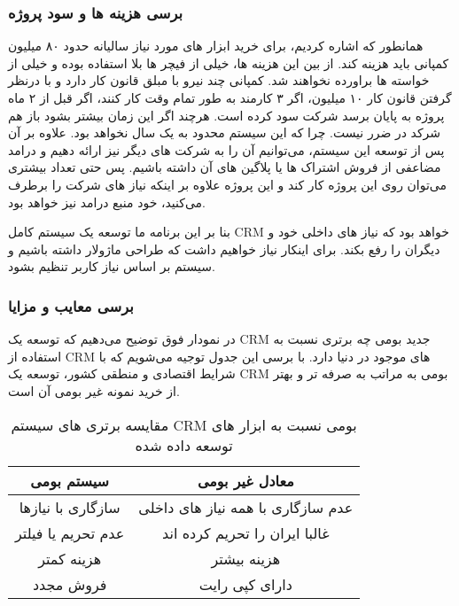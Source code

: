 \subsubsection{برسی هزینه ها و سود پروژه}
همانطور که اشاره کردیم، برای خرید ابزار های مورد نیاز سالیانه حدود ۸۰ میلیون کمپانی باید هزینه کند. از بین این هزینه ها، خیلی از فیچر ها بلا استفاده بوده
و خیلی از خواسته ها براورده نخواهند شد.
کمپانی چند نیرو با مبلق قانون کار دارد و با درنظر گرفتن قانون کار ۱۰ میلیون، اگر ۳ کارمند به طور تمام وقت کار کنند، اگر قبل از ۲ ماه پروژه به پایان برسد شرکت سود کرده است.
هرچند اگر این زمان بیشتر بشود باز هم شرکد در ضرر نیست. چرا که این سیستم محدود به یک سال نخواهد بود.
علاوه بر آن پس از توسعه این سیستم، می‌توانیم آن را به شرکت های دیگر نیز ارائه دهیم و درامد مضاعفی از فروش اشتراک ها یا پلاگین های آن داشته باشیم.
پس حتی تعداد بیشتری می‌توان روی این پروژه کار کند و این پروژه علاوه بر اینکه نیاز های شرکت را برطرف می‌کنید، خود منبع درامد نیز خواهد بود.

بنا بر این برنامه ما توسعه یک سیستم کامل CRM خواهد بود که نیاز های داخلی خود و دیگران را رفع بکند.
برای اینکار نیاز خواهیم داشت که طراحی ماژولار داشته باشیم و سیستم بر اساس نیاز کاربر تنظیم بشود.

\subsubsection{برسی معایب و مزایا}
در نمودار فوق توضیح می‌دهیم که توسعه یک CRM جدید بومی چه برتری نسبت به استفاده از CRM های موجود در دنیا دارد.
با برسی این جدول توجیه می‌شویم که با شرایط اقتصادی و منطقی کشور، توسعه یک CRM بومی به مراتب به صرفه تر و بهتر از خرید نمونه غیر بومی آن است.

\begin{table}[h!]
\begin{center}
	\caption{مقایسه برتری های سیستم CRM بومی نسبت به ابزار های توسعه داده شده}
	\label{tap:custom_crm_is_better}
	\begin{tabular}{|c|c|}
		\hline
		سیستم بومی & معادل غیر بومی \\
		\hline
		سازگاری با نیازها & عدم سازگاری با همه نیاز های داخلی \\
		\hline
		عدم تحریم یا فیلتر & غالبا ایران را تحریم کرده اند \\
		\hline
		هزینه کمتر & هزینه بیشتر \\
		\hline
		فروش مجدد & دارای کپی رایت \\
		\hline
	\end{tabular}
\end{center}
\end{table}

